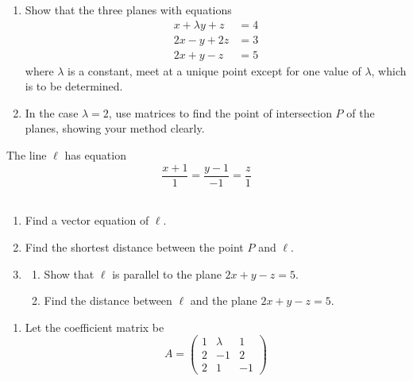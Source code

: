 \documentclass[leqno]{article}
\begin{document}
\begin{enumerate}[
  label=\textbf{\arabic*.},
  leftmargin=*,
  topsep=0pt,
  partopsep=0pt,
  parsep=0pt
]
\begin{enumerate}[label=\textbf{(\alph*)}]
  \item Show that the three planes with equations
  \[
  \begin{aligned}
  x+\lambda y+z&=4 \\
  2x-y+2z&=3 \\
  2x+y-z&=5
  \end{aligned}
  \]
  where $\lambda$ is a constant, meet at a unique point except for one value of $\lambda$, which is to be determined. \\
  \item In the case $\lambda=2$, use matrices to find the point of intersection $P$ of the planes, showing your method clearly.  \\
\end{enumerate}
The line $\ell$ has equation
\[
\frac{x+1}{1}=\frac{y-1}{-1}=\frac{z}{1}
\] \\
\begin{enumerate}[label=\textbf{(\alph*)}, resume]
  \item Find a vector equation of $\ell$.  \\
  \item Find the shortest distance between the point $P$ and $\ell$.  \\
  \item
  \begin{enumerate}[label=(\roman*)]
    \item Show that $\ell$ is parallel to the plane $2x+y-z=5$. 
    \item Find the distance between $\ell$ and the plane $2x+y-z=5$.  \\
  \end{enumerate}
\end{enumerate}

\vspace*{30pt}

\begin{tcolorbox}[colback=white, colframe=scarlet, title={\textbf{Solution}}, breakable, grow to left by=6mm, grow to right by=10mm]
\begin{enumerate}[label=\textbf{(\alph*)}]
  \item Let the coefficient matrix be
\[
A=\begin{pmatrix}
1 & \lambda & 1\\
2 & -1 & 2\\
2 & 1 & -1
\end{pmatrix}
\]


\end{enumerate}
\end{tcolorbox}
\end{enumerate}
\end{document}
